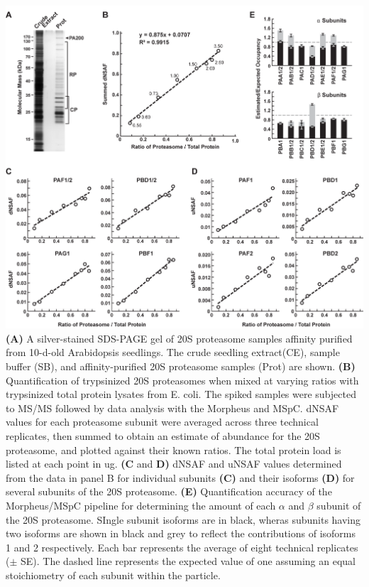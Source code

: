 \begin{FPfigure}
	\centering
	\includegraphics[width=\columnwidth]{MSpC/figure2_rescale.png}
	{\textbf{(A)} A silver-stained SDS-PAGE gel of 20S proteasome samples affinity purified from 10-d-old Arabidopsis seedlings. The crude seedling extract(CE), sample buffer (SB), and affinity-purified 20S proteasome samples (Prot) are shown. \textbf{(B)} Quantification of trypsinized 20S proteasomes when mixed at varying ratios with trypsinized total protein lysates from E. coli. The spiked samples were subjected to MS/MS followed by data analysis with the Morpheus and MSpC. dNSAF values for each proteasome subunit were averaged across three technical replicates, then summed to obtain an estimate of abundance for the 20S proteasome, and plotted against their known ratios. The total protein load is listed at each point in ug. \textbf{(C} and \textbf{D)} dNSAF and uNSAF values determined from the data in panel B for individual subunits \textbf{(C)} and their isoforms \textbf{(D)} for several subunits of the 20S proteasome. \textbf{(E)} Quantification accuracy of the Morpheus/MSpC pipeline for determining the amount of each $\alpha$ and $\beta$ subunit of the 20S proteasome. SIngle subunit isoforms are in black, wheras subunits having two isoforms are shown in black and grey to reflect the contributions of isoforms 1 and 2 respectively. Each bar represents the average of eight technical replicates ($\pm$ SE). The dashed line represents the expected value of one assuming an equal stoichiometry of each subunit within the particle.}
	\label{fig:proteasomespike}
\end{FPfigure}
